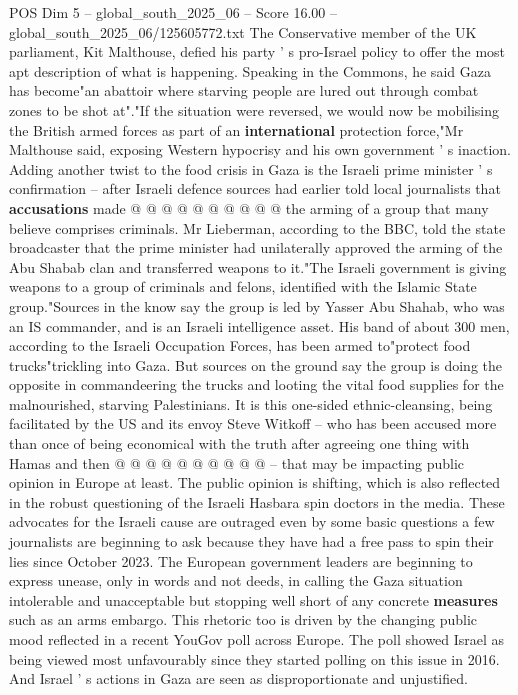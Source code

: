 \begin{textsample}{POS Dim 5 – global\_south\_2025\_06 – Score 16.00 – global\_south\_2025\_06/125605772.txt}
The Conservative member of the UK parliament, Kit Malthouse, defied his party ' s pro-Israel policy to offer the most apt description of what is happening.
Speaking in the Commons, he said Gaza has become"an abattoir where starving people are lured out through combat zones to be shot at"."If the situation were reversed, we would now be mobilising the British armed forces as part of an \textbf{international} protection force,"Mr Malthouse said, exposing Western hypocrisy and his own government ' s inaction.
Adding another twist to the food crisis in Gaza is the Israeli prime minister ' s confirmation -- after Israeli defence sources had earlier told local journalists that \textbf{accusations} made @ @ @ @ @ @ @ @ @ @ the arming of a group that many believe comprises criminals.
Mr Lieberman, according to the BBC, told the state broadcaster that the prime minister had unilaterally approved the arming of the Abu Shabab clan and transferred weapons to it."The Israeli government is giving weapons to a group of criminals and felons, identified with the Islamic State group."Sources in the know say the group is led by Yasser Abu Shahab, who was an IS commander, and is an Israeli intelligence asset.
His band of about 300 men, according to the Israeli Occupation Forces, has been armed to"protect food trucks"trickling into Gaza.
But sources on the ground say the group is doing the opposite in commandeering the trucks and looting the vital food supplies for the malnourished, starving Palestinians.
It is this one-sided ethnic-cleansing, being facilitated by the US and its envoy Steve Witkoff -- who has been accused more than once of being economical with the truth after agreeing one thing with Hamas and then @ @ @ @ @ @ @ @ @ @ -- that may be impacting public opinion in Europe at least.
The public opinion is shifting, which is also reflected in the robust questioning of the Israeli Hasbara spin doctors in the media.
These advocates for the Israeli cause are outraged even by some basic questions a few journalists are beginning to ask because they have had a free pass to spin their lies since October 2023.
The European government leaders are beginning to express unease, only in words and not deeds, in calling the Gaza situation intolerable and unacceptable but stopping well short of any concrete \textbf{measures} such as an arms embargo.
This rhetoric too is driven by the changing public mood reflected in a recent YouGov poll across Europe.
The poll showed Israel as being viewed most unfavourably since they started polling on this issue in 2016.
And Israel ' s actions in Gaza are seen as disproportionate and unjustified.

\end{textsample}

